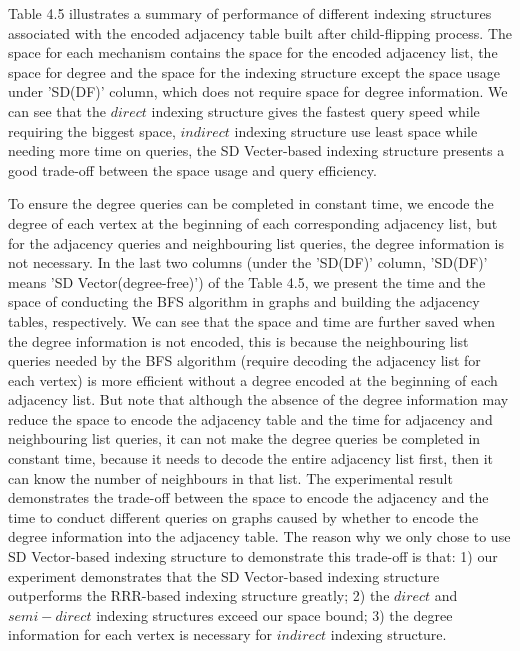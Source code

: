 \documentclass[12pt,glossary]{dalthesis}
\begin{document}
\bigskip

Table 4.5 illustrates a summary of performance of different indexing structures associated with the encoded adjacency table built after child-flipping process. The space for each mechanism contains the space for the encoded adjacency list, the space for degree and the space for the indexing structure except the space usage under 'SD(DF)' column, which does not require space for degree information. We can see that the $direct$ indexing structure gives the fastest query speed while requiring the biggest space, $indirect$ indexing structure use least space while needing more time on queries, the SD Vecter-based indexing structure presents a good trade-off between the space usage and query efficiency. 

\bigskip
\bigskip

To ensure the degree queries can be completed in constant time, we encode the degree of each vertex at the beginning of each corresponding adjacency list, but for the adjacency queries and neighbouring list queries, the degree information is not necessary. In the last two columns (under the 'SD(DF)' column, 'SD(DF)' means 'SD Vector(degree-free)') of the Table 4.5, we present the time and the space of conducting the BFS algorithm in graphs and building the adjacency tables, respectively. We can see that the space and time are further saved when the degree information is not encoded, this is because the neighbouring list queries needed by the BFS algorithm (require decoding the adjacency list for each vertex) is more efficient without a degree encoded at the beginning of each adjacency list. But note that although the absence of the degree information may reduce the space to encode the adjacency table and the time for adjacency and neighbouring list queries, it can not make the degree queries be completed in constant time, because it needs to decode the entire adjacency list first, then it can know the number of neighbours in that list. The experimental result demonstrates the trade-off between the space to encode the adjacency and the time to conduct different queries on graphs caused by whether to encode the degree information into the adjacency table. The reason why we only chose to use SD Vector-based indexing structure to demonstrate this trade-off is that: 1) our experiment demonstrates that the SD Vector-based indexing structure outperforms the RRR-based indexing structure greatly; 2) the $direct$ and $semi-direct$ indexing structures exceed our space bound; 3) the degree information for each vertex is necessary for $indirect$ indexing structure.  
\end{document}
